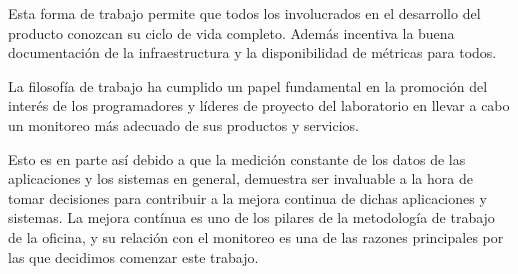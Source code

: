 Esta forma de trabajo permite que todos los involucrados en el desarrollo del
producto conozcan su ciclo de vida completo. Además incentiva la buena
documentación de la infraestructura y la disponibilidad de métricas para todos.

La filosofía de trabajo ha cumplido un papel fundamental en la promoción del
interés de los programadores y líderes de proyecto del laboratorio en llevar a
cabo un monitoreo más adecuado de sus productos y servicios.

Esto es en parte así debido a que la medición constante de los datos de las
aplicaciones y los sistemas en general, demuestra ser invaluable a la hora de
tomar decisiones para contribuir a la mejora continua de dichas aplicaciones y
sistemas. La mejora contínua es uno de los pilares de la metodología de trabajo
de la oficina, y su relación con el monitoreo es una de las razones principales
por las que decidimos comenzar este trabajo.

